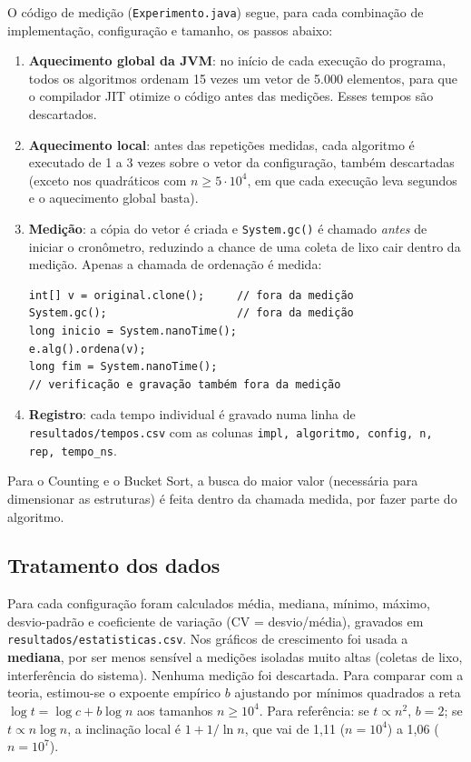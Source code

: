\documentclass[11pt,a4paper]{article}
\begin{document}
O código de medição (\texttt{Experimento.java}) segue, para cada combinação de implementação,
configuração e tamanho, os passos abaixo:
\begin{enumerate}
  \item \textbf{Aquecimento global da JVM}: no início de cada execução do programa, todos os
        algoritmos ordenam 15 vezes um vetor de 5.000 elementos, para que o compilador JIT
        otimize o código antes das medições. Esses tempos são descartados.
  \item \textbf{Aquecimento local}: antes das repetições medidas, cada algoritmo é executado de 1
        a 3 vezes sobre o vetor da configuração, também descartadas (exceto nos quadráticos com
        $n \ge 5\cdot10^4$, em que cada execução leva segundos e o aquecimento global basta).
  \item \textbf{Medição}: a cópia do vetor é criada e \texttt{System.gc()} é chamado
        \emph{antes} de iniciar o cronômetro, reduzindo a chance de uma coleta de lixo cair dentro
        da medição. Apenas a chamada de ordenação é medida:
\begin{lstlisting}
int[] v = original.clone();     // fora da medição
System.gc();                    // fora da medição
long inicio = System.nanoTime();
e.alg().ordena(v);
long fim = System.nanoTime();
// verificação e gravação também fora da medição
\end{lstlisting}
  \item \textbf{Registro}: cada tempo individual é gravado numa linha de
        \texttt{resultados/tempos.csv} com as colunas \texttt{impl, algoritmo, config, n, rep, tempo\_ns}.
\end{enumerate}

Para o Counting e o Bucket Sort, a busca do maior valor (necessária para dimensionar as estruturas)
é feita dentro da chamada medida, por fazer parte do algoritmo.

\subsection{Tratamento dos dados}

Para cada configuração foram calculados média, mediana, mínimo, máximo, desvio-padrão e
coeficiente de variação (CV = desvio/média), gravados em \texttt{resultados/estatisticas.csv}.
Nos gráficos de crescimento foi usada a \textbf{mediana}, por ser menos sensível a medições
isoladas muito altas (coletas de lixo, interferência do sistema). Nenhuma medição foi descartada.
Para comparar com a teoria, estimou-se o expoente empírico $b$ ajustando por mínimos quadrados a
reta $\log t = \log c + b \log n$ aos tamanhos $n \ge 10^4$. Para referência: se $t \propto n^2$,
$b = 2$; se $t \propto n \log n$, a inclinação local é $1 + 1/\ln n$, que vai de 1,11 ($n=10^4$) a 1,06 ($n=10^7$).
\end{document}
